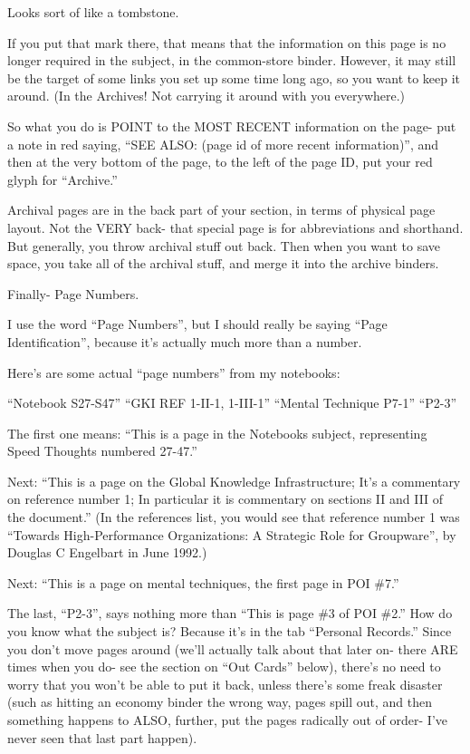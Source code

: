 \documentclass[oneside]{book}
\begin{document}
Looks sort of like a tombstone.

If you put that mark there, that means that the information on this
page is no longer required in the subject, in the common-store
binder. However, it may still be the target of some links you set up
some time long ago, so you want to keep it around. (In the Archives!
Not carrying it around with you everywhere.)

So what you do is POINT to the MOST RECENT information on the page-
put a note in red saying, ``SEE ALSO: (page id of more recent
information)'', and then at the very bottom of the page, to the left of
the page ID, put your red glyph for ``Archive.''

Archival pages are in the back part of your section, in terms of
physical page layout. Not the VERY back- that special page is for
abbreviations and shorthand. But generally, you throw archival stuff
out back. Then when you want to save space, you take all of the
archival stuff, and merge it into the archive binders.

Finally- Page Numbers.

I use the word ``Page Numbers'', but I should really be saying ``Page
Identification'', because it's actually much more than a number.

Here's are some actual ``page numbers'' from my notebooks:

  ``Notebook S27-S47''
  ``GKI REF 1-II-1, 1-III-1''
  ``Mental Technique P7-1''
  ``P2-3''

The first one means: ``This is a page in the Notebooks subject,
representing Speed Thoughts numbered 27-47.''

Next: ``This is a page on the Global Knowledge Infrastructure; It's a
commentary on reference number 1; In particular it is commentary on
sections II and III of the document.'' (In the references list, you
would see that reference number 1 was ``Towards High-Performance
Organizations: A Strategic Role for Groupware'', by Douglas C Engelbart
in June 1992.)

Next: ``This is a page on mental techniques, the first page in POI \#7.''

The last, ``P2-3'', says nothing more than ``This is page \#3 of POI \#2.''
How do you know what the subject is? Because it's in the tab ``Personal
Records.'' Since you don't move pages around (we'll actually talk about
that later on- there ARE times when you do- see the section on ``Out
Cards'' below), there's no need to worry that you won't be able to put
it back, unless there's some freak disaster (such as hitting an
economy binder the wrong way, pages spill out, and then something
happens to ALSO, further, put the pages radically out of order- I've
never seen that last part happen).
\end{document}
